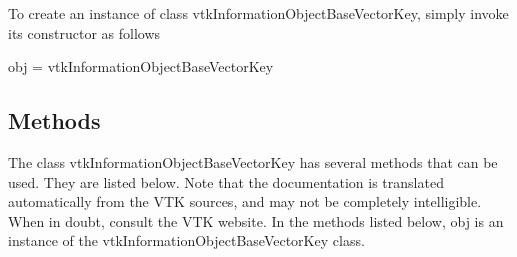 To create an instance of class vtk\-Information\-Object\-Base\-Vector\-Key, simply invoke its constructor as follows \begin{DoxyVerb}  obj = vtkInformationObjectBaseVectorKey
\end{DoxyVerb}
 \hypertarget{vtkwidgets_vtkxyplotwidget_Methods}{}\subsection{Methods}\label{vtkwidgets_vtkxyplotwidget_Methods}
The class vtk\-Information\-Object\-Base\-Vector\-Key has several methods that can be used. They are listed below. Note that the documentation is translated automatically from the V\-T\-K sources, and may not be completely intelligible. When in doubt, consult the V\-T\-K website. In the methods listed below, {\ttfamily obj} is an instance of the vtk\-Information\-Object\-Base\-Vector\-Key class. 
